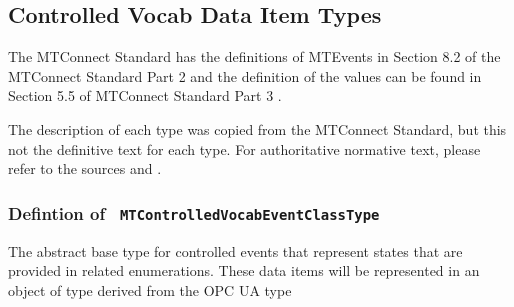 \FloatBarrier
\subsection{Controlled Vocab Data Item Types} \label{model:ControlledVocabDataItemTypes}

The MTConnect Standard has the definitions of \glspl{MTEvent} in 
Section 8.2 of the MTConnect Standard Part 2 \cite{MTCPart2} and the definition of the 
values can be found in Section 5.5 of MTConnect Standard Part 3 \cite{MTCPart3}. 

The description of each type was copied from the MTConnect Standard,
but this not the definitive text for each type. For authoritative normative text, 
please refer to the sources \cite{MTCPart2} and \cite{MTCPart3}.

\subsubsection{Defintion of \texttt{ MTControlledVocabEventClassType}}
  \label{type:MTControlledVocabEventClassType}

\FloatBarrier

The abstract base type for controlled events that represent states that are provided
in related enumerations. These data items will be represented in an object of
type  derived from the OPC UA type

